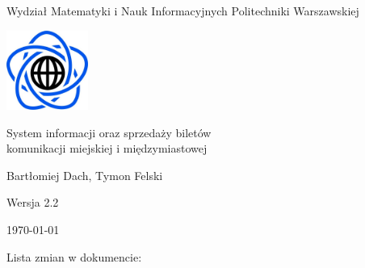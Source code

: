 \documentclass[10pt,a4paper]{article}
\begin{document}
\begin{titlepage}
	\centering
	{\Large Wydział Matematyki i Nauk Informacyjnych Politechniki Warszawskiej \par}
	\vspace{1cm}
	\includegraphics[width=0.2\textwidth]{logo.png} \par
	\vspace{5cm}
	{\LARGE System informacji oraz sprzedaży biletów\\komunikacji miejskiej i międzymiastowej \par}
	\vspace{0.5cm}
	{\Large Bartłomiej Dach, Tymon Felski \par}
	\vspace{1.5cm}
	{\Large Wersja 2.2 \par}
	\vspace{1.5cm}
	{\Large \today \par}
\end{titlepage}
Lista zmian w dokumencie:
\end{document}
